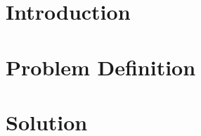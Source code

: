 \documentclass[a4paper,11pt,twoside,onecolumn,final,openright]{book}
\begin{document}


\pagestyle{headings}




\part{Introduction}
\thispagestyle{empty}



\part{Problem Definition}
\thispagestyle{empty}








\part{Solution}







\end{document}
